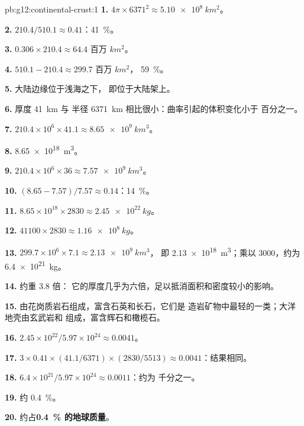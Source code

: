 \begin{solution}{pb:g12:continental-crust:1}
\textbf{1.} $4\pi \times 6371^2 \approx \qty{5.10e8}{km^2}$。

\textbf{2.} $210.4/510.1 \approx 0.41$：\qty{41}{\percent}。

\textbf{3.} $0.306 \times 210.4 \approx \num{64.4}\text{ 百万 }\unit{km^2}$。

\textbf{4.} $510.1 - 210.4 \approx \num{299.7}\text{ 百万 }\unit{km^2}$，
\qty{59}{\percent}。

\textbf{5.} 大陆边缘位于浅海之下，
即位于大陆架上。

\textbf{6.} 厚度 \qty{41}{km} 与
半径 \qty{6371}{km} 相比很小：曲率引起的体积变化小于
百分之一。

\textbf{7.} $210.4 \times 10^6 \times 41.1 \approx \qty{8.65e9}{km^3}$。

\textbf{8.} \qty{8.65e18}{m^3}。

\textbf{9.} $210.4 \times 10^6 \times 36 \approx \qty{7.57e9}{km^3}$。

\textbf{10.} $(8.65 - 7.57)/7.57 \approx 0.14$：\qty{14}{\percent}。

\textbf{11.} $8.65 \times 10^{18} \times 2830 \approx \qty{2.45e22}{kg}$。

\textbf{12.} $41100 \times 2830 \approx \qty{1.16e8}{kg}$。

\textbf{13.} $299.7 \times 10^6 \times 7.1 \approx \qty{2.13e9}{km^3}$，
即 \qty{2.13e18}{m^3}；乘以 3000，约为 \qty{6.4e21}{kg}。

\textbf{14.} 约重 3.8 倍：
它的厚度几乎为六倍，足以抵消面积和密度较小的影响。

\textbf{15.} 由花岗质岩石组成，富含石英和长石，它们是
造岩矿物中最轻的一类；大洋地壳由玄武岩和
组成，富含辉石和橄榄石。

\textbf{16.} $2.45 \times 10^{22}/5.97 \times 10^{24} \approx 0.0041$。

\textbf{17.} $3 \times 0.41 \times (41.1/6371) \times (2830/5513) \approx
0.0041$：结果相同。

\textbf{18.} $6.4 \times 10^{21}/5.97 \times 10^{24} \approx 0.0011$：约为
千分之一。

\textbf{19.} 约 \qty{0.4}{\percent}。

\textbf{20.} 约占\textbf{\qty{0.4}{\percent}
的地球质量}。
\end{solution}
